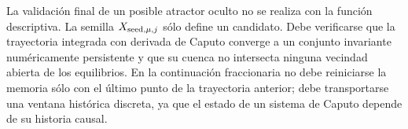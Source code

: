 La validación final de un posible atractor oculto no se realiza con la función
descriptiva. La semilla \(X_{{\rm seed},\mu,j}\) sólo define un candidato.
Debe verificarse que la trayectoria integrada con derivada de Caputo converge
a un conjunto invariante numéricamente persistente y que su cuenca no
intersecta ninguna vecindad abierta de los equilibrios. En la continuación
fraccionaria no debe reiniciarse la memoria sólo con el último punto de la
trayectoria anterior; debe transportarse una ventana histórica discreta, ya que
el estado de un sistema de Caputo depende de su historia causal.